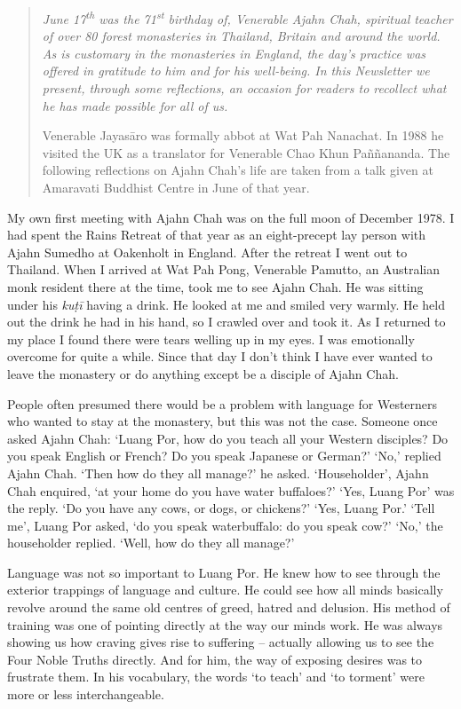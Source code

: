 
\begin{quote}\itshape
June 17\textsuperscript{th} was the 71\textsuperscript{st} birthday of, Venerable Ajahn Chah, spiritual
teacher of over 80 forest monasteries in Thailand, Britain and around
the world. As is customary in the monasteries in England, the day's
practice was offered in gratitude to him and for his well-being. In this
Newsletter we present, through some reflections, an occasion for readers
to recollect what he has made possible for all of us.

Venerable Jayasāro was formally abbot at Wat Pah
Nanachat. In 1988 he visited the UK as a translator for Venerable Chao
Khun Paññananda. The following reflections on Ajahn Chah's life are
taken from a talk given at Amaravati Buddhist Centre in June of that
year.
\end{quote}

\noindent
My own first meeting with Ajahn Chah was on the full moon of December
1978. I had spent the Rains Retreat of that year as an eight-precept lay
person with Ajahn Sumedho at Oakenholt in England. After the retreat I
went out to Thailand. When I arrived at Wat Pah Pong, Venerable Pamutto, 
an Australian monk resident there at the time, took me to see Ajahn
Chah. He was sitting under his \emph{kuṭī} having a drink. He looked at
me and smiled very warmly. He held out the drink he had in his hand, so
I crawled over and took it. As I returned to my place I found there were
tears welling up in my eyes. I was emotionally overcome for quite a
while. Since that day I don't think I have ever wanted to leave the
monastery or do anything except be a disciple of Ajahn Chah. 

People often presumed there would be a problem with language for
Westerners who wanted to stay at the monastery, but this was not the
case. Someone once asked Ajahn Chah: `Luang Por, how do you teach all
your Western disciples? Do you speak English or French? Do you speak
Japanese or German?' `No,' replied Ajahn Chah. `Then how do they all
manage?' he asked. `Householder', Ajahn Chah enquired, `at your home do
you have water buffaloes?' `Yes, Luang Por' was the reply. `Do you have
any cows, or dogs, or chickens?' `Yes, Luang Por.' `Tell me', Luang Por
asked, `do you speak waterbuffalo: do you speak cow?' `No,' the
householder replied. `Well, how do they all manage?'

Language was not so important to Luang Por. He knew how to see through
the exterior trappings of language and culture. He could see how all
minds basically revolve around the same old centres of greed, hatred and
delusion. His method of training was one of pointing directly at the way
our minds work. He was always showing us how craving gives rise to
suffering -- actually allowing us to see the Four Noble Truths directly.
And for him, the way of exposing desires was to frustrate them. In his
vocabulary, the words `to teach' and `to torment' were more or less
interchangeable.

